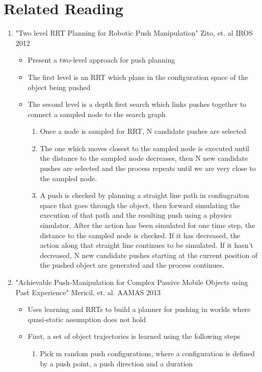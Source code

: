 \documentclass[11pt, oneside]{article}   	%
\begin{document}
\section*{Related Reading}
\begin{enumerate}
\item "Two level RRT Planning for Robotic Push Manipulation" Zito, et. al  IROS 2012
\begin{itemize}
\item Present a two-level approach for push planning
\item The first level is an RRT which plans in the configuration space of the object being pushed
\item The second level is a depth first search which links pushes together to connect a sampled node to the search graph
\begin{enumerate}
\item Once a node is sampled for RRT, N candidate pushes are selected
\item The one which moves closest to the sampled node is executed until the distance to the sampled node decreases, then N new candidate pushes are selected and the process repeats until we are very close to the sampled node.
\item A push is checked by planning a straight line path in confiugraiton space that goes through the object, then forward simulating the execution of that path and the resulting push using a physics simulator.  After the action has been simulated for one time step, the distance to the sampled node is checked.  If it has decreased, the action along that straight line continues to be simulated. If it hasn't decreased, N new candidate pushes starting at the current position of the pushed object are generated and the process continues.
\end{enumerate}
\end{itemize}
\item "Achievable Push-Manipulation for Complex Passive Mobile Objects using Past Experience" Mericil, et. al. AAMAS 2013
\begin{itemize}
\item Uses learning and RRTs to build a planner for pushing in worlds where quasi-static assumption does not hold
\item First, a set of object trajectories is learned using the following steps
\begin{enumerate}
\item Pick m random push configurations, where a configuration is defined by a push point, a push direction and a duration

\end{enumerate}
\end{itemize}
\end{enumerate}
\end{document}
